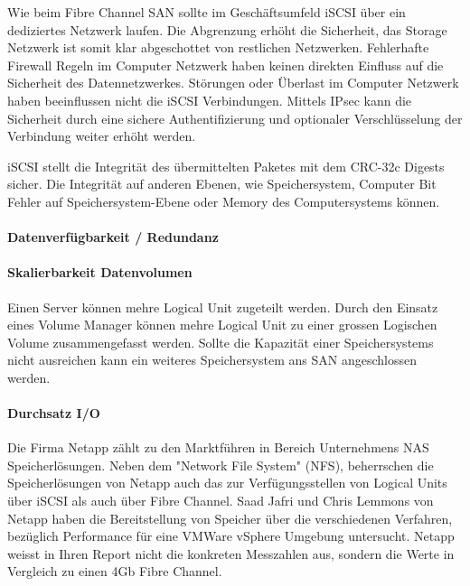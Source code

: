 Wie beim Fibre Channel SAN sollte im Geschäftsumfeld iSCSI über ein dediziertes Netzwerk laufen. Die Abgrenzung erhöht die Sicherheit, das Storage Netzwerk ist somit klar abgeschottet von restlichen Netzwerken. Fehlerhafte Firewall Regeln im Computer Netzwerk haben keinen direkten Einfluss auf die Sicherheit des Datennetzwerkes. Störungen oder Überlast im Computer Netzwerk haben beeinflussen nicht die iSCSI Verbindungen. Mittels IPsec kann die Sicherheit durch eine sichere Authentifizierung und optionaler Verschlüsselung der Verbindung weiter erhöht werden. 

iSCSI stellt die Integrität des übermittelten Paketes mit dem CRC-32c Digests sicher. Die Integrität auf anderen Ebenen, wie Speichersystem, Computer Bit Fehler auf Speichersystem-Ebene oder Memory des Computersystems können. 

\paragraph*{Datenverfügbarkeit / Redundanz}


\paragraph*{Skalierbarkeit Datenvolumen}
Einen Server können mehre Logical Unit zugeteilt werden. Durch den Einsatz eines Volume Manager können mehre Logical Unit zu einer grossen Logischen Volume zusammengefasst werden. Sollte die Kapazität einer Speichersystems nicht ausreichen kann ein weiteres Speichersystem ans SAN angeschlossen werden.

\paragraph*{Durchsatz I/O}
Die Firma Netapp zählt zu den Marktführen in Bereich Unternehmens NAS Speicherlösungen. Neben dem "Network File System" (NFS), beherrschen die Speicherlösungen von Netapp auch das zur Verfügungsstellen von Logical Units über iSCSI als auch über Fibre Channel. Saad Jafri und Chris Lemmons von Netapp haben die Bereitstellung von Speicher über die verschiedenen Verfahren, bezüglich Performance für eine VMWare vSphere Umgebung untersucht. Netapp weisst in Ihren Report nicht die konkreten Messzahlen aus, sondern die Werte in Vergleich zu einen 4Gb Fibre Channel.

